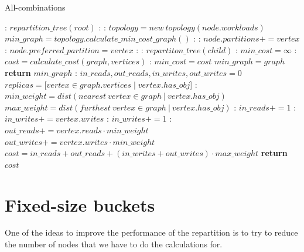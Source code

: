\begin{algorithm}
  \caption{All-combinations}\label{alg:all-combinations}
  \begin{algorithmic}[1]
  :
  \State $repartition\_tree(root)$
  \EndFunction
  :
    :
      \State $topology = new\ topology(node.workloads)$
      \State $min\_graph =  topology.calculate\_min\_cost\_graph()$
      :
        :
        \State $node.partitions += vertex$
          :
            \State $node.preferred\_partition = vertex$
          \EndIf
        \EndIf
      \EndFor
    \EndIf
    :
      :
        \State $repartiton\_tree(child)$
        \EndFor
    \EndIf
    \EndFunction
    :
    \State $min\_cost = \infty$
      :
        \State $cost = calculate\_cost(graph, vertices)$
        :
          \State $min\_cost = cost$
          \State $min\_graph = graph$
        \EndIf
      \EndFor
    \State \textbf{return} $min\_graph$
    \EndFunction
    :
      \State $in\_reads, out\_reads, in\_writes, out\_writes = 0$
      \State $replicas = [vertex \in graph.vertices \mid vertex.has\_obj$]
      :
      \State $min\_weight = dist(nearest\ vertex \in graph\ |\  vertex.has\_obj)$
      \State $max\_weight = dist(furthest\ vertex \in graph\ |\ vertex.has\_obj)$
        :
          \State $in\_reads+= 1$
          :
          \State $in\_writes+= vertex.writes$
          \Else:
          \State  $in\_writes+= 1 $
          \EndIf
        \Else:
          \State $out\_reads += vertex.reads \cdot min\_weight$
          \State $out\_writes += vertex.writes \cdot min\_weight$
        \EndIf
      \EndFor
      \State $cost = in\_reads+ out\_reads + (in\_writes+ out\_writes) \cdot max\_weight$
      \State \textbf{return} $cost$
  \EndFunction
  \end{algorithmic}
  \end{algorithm}

\section{Fixed-size buckets}\label{sec:fixed-size buckets}
One of the ideas to improve the performance of the repartition is to try to reduce the number of nodes that we have to do the calculations for.


